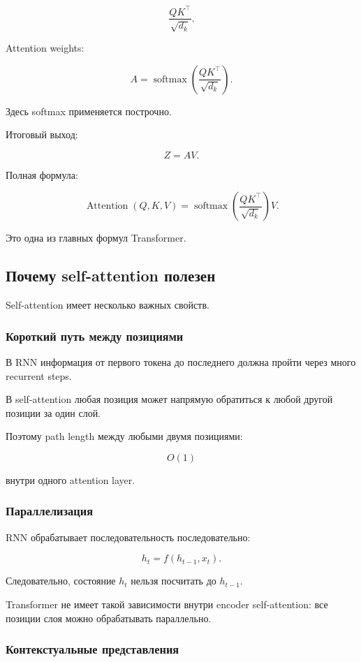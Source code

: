 \documentclass[a4paper,12pt]{article}
\begin{document}
\[
\frac{QK^\top}{\sqrt{d_k}}.
\]

Attention weights:

\[
A =
\operatorname{softmax}
\left(
\frac{QK^\top}{\sqrt{d_k}}
\right).
\]

Здесь softmax применяется построчно.

Итоговый выход:

\[
Z =
AV.
\]

Полная формула:

\[
\operatorname{Attention}(Q,K,V)
=
\operatorname{softmax}
\left(
\frac{QK^\top}{\sqrt{d_k}}
\right)V.
\]

Это одна из главных формул Transformer.

\subsection{Почему self-attention полезен}

Self-attention имеет несколько важных свойств.

\subsubsection{Короткий путь между позициями}

В RNN информация от первого токена до последнего должна пройти через много recurrent steps.

В self-attention любая позиция может напрямую обратиться к любой другой позиции за один слой.

Поэтому path length между любыми двумя позициями:

\[
O(1)
\]

внутри одного attention layer.

\subsubsection{Параллелизация}

RNN обрабатывает последовательность последовательно:

\[
h_t = f(h_{t-1}, x_t).
\]

Следовательно, состояние \(h_t\) нельзя посчитать до \(h_{t-1}\).

Transformer не имеет такой зависимости внутри encoder self-attention: все позиции слоя можно обрабатывать параллельно.

\subsubsection{Контекстуальные представления}
\end{document}
